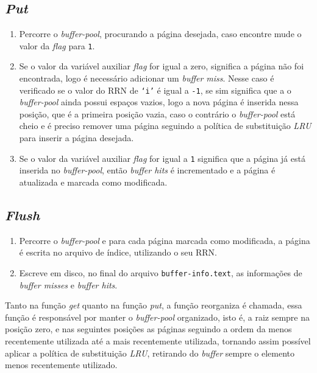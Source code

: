 \documentclass[
	12pt,				%
	openany,			%
	twoside,			%
	a4paper,			%
	english,			%
	french,				%
	spanish,			%
	brazil,				%
	]{abntex2}
\begin{document}
    \subsection{\textit{Put}}
        \begin{enumerate}
            \item Percorre o \textit{buffer-pool}, procurando a página desejada, caso encontre mude o valor da \textit{flag} para \verb|1|.
            \item Se o valor da variável auxiliar \textit{flag} for igual a zero, significa a página não foi encontrada, logo é necessário adicionar um \textit{buffer miss}. Nesse caso é verificado se o valor do RRN de \verb|‘i’| é igual a \verb|-1|, se sim significa que a o \textit{buffer-pool} ainda possui espaços vazios, logo a nova página é inserida nessa posição, que é a primeira posição vazia, caso o contrário o \textit{buffer-pool} está cheio e é preciso remover uma página seguindo a política de substituição \textit{LRU} para inserir a página desejada.
            \item Se o valor da variável auxiliar \textit{flag} for igual a \verb|1| significa que a página já está inserida no \textit{buffer-pool}, então \textit{buffer hits} é incrementado e a página é atualizada e marcada como modificada.
        \end{enumerate}
    \subsection{\textit{Flush}}
        \begin{enumerate}
            \item Percorre o \textit{buffer-pool} e para cada página marcada como modificada, a página é escrita no arquivo de índice, utilizando o seu RRN.
            \item Escreve em disco, no final do arquivo \verb|buffer-info.text|, as informações de \textit{buffer misses} e \textit{buffer hits}.
        \end{enumerate}
    
    Tanto na função \textit{get} quanto na função \textit{put}, a função reorganiza é chamada, essa função é responsável por manter o \textit{buffer-pool} organizado, isto é, a raiz sempre na posição zero, e nas seguintes posições as páginas seguindo a ordem da menos recentemente utilizada até a mais recentemente utilizada, tornando assim possível aplicar a política de substituição \textit{LRU}, retirando do \textit{buffer} sempre o elemento menos recentemente utilizado.
\end{document}
